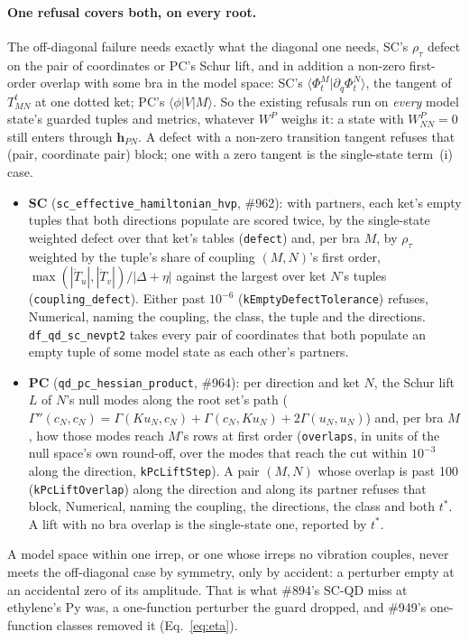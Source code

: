 \documentclass[11pt]{article}
\newcommand{\code}[1]{\texttt{#1}}
\begin{document}
\paragraph{One refusal covers both, on every root.} The off-diagonal
failure needs exactly what the diagonal one needs, SC's $\rho_\tau$ defect
on the pair of coordinates or PC's Schur lift, and in addition a non-zero
first-order overlap with some bra in the model space: SC's
$\langle\Phi^M_t|\partial_q\Phi^N_t\rangle$, the tangent of $T^t_{MN}$ at
one dotted ket; PC's $\langle\phi|V|M\rangle$. So the existing refusals run
on \emph{every} model state's guarded tuples and metrics, whatever $W^P$
weighs it: a state with $W^P_{NN} = 0$ still enters through $\mathbf
h_{PN}$. A defect with a non-zero transition tangent refuses that (pair,
coordinate pair) block; one with a zero tangent is the single-state
term~(i) case.
\begin{itemize}
\item \textbf{SC} (\code{sc\_effective\_hamiltonian\_hvp}, \#962): with
  partners, each ket's empty tuples that both directions populate are
  scored twice, by the single-state weighted defect over that ket's tables
  (\code{defect}) and, per bra $M$, by $\rho_\tau$ weighted by the tuple's
  share of coupling $(M, N)$'s first order, $\max(|\dot T_u|, |\dot
  T_v|)/|\Delta + \eta|$ against the largest over ket $N$'s tuples
  (\code{coupling\_defect}). Either past $10^{-6}$
  (\code{kEmptyDefectTolerance}) refuses, Numerical, naming the coupling,
  the class, the tuple and the directions. \code{df\_qd\_sc\_nevpt2} takes
  every pair of coordinates that both populate an empty tuple of some model
  state as each other's partners.
\item \textbf{PC} (\code{qd\_pc\_hessian\_product}, \#964): per direction
  and ket $N$, the Schur lift $L$ of $N$'s null modes along the root set's
  path ($\Gamma''(c_N, c_N) = \Gamma(Ku_N, c_N) + \Gamma(c_N, Ku_N) +
  2\Gamma(u_N, u_N)$) and, per bra $M$, how those modes reach $M$'s rows at
  first order (\code{overlaps}, in units of the null space's own round-off,
  over the modes that reach the cut within $10^{-3}$ along the direction,
  \code{kPcLiftStep}). A pair $(M, N)$ whose overlap is past 100
  (\code{kPcLiftOverlap}) along the direction and along its partner refuses
  that block, Numerical, naming the coupling, the directions, the class and
  both $t^*$. A lift with no bra overlap is the single-state one, reported
  by $t^*$.
\end{itemize}
A model space within one irrep, or one whose irreps no vibration couples,
never meets the off-diagonal case by symmetry, only by accident: a
perturber empty at an accidental zero of its amplitude. That is what
\#894's SC-QD miss at ethylene's Py was, a one-function perturber the guard
dropped, and \#949's one-function classes removed it (Eq.~\eqref{eq:eta}).
\end{document}
